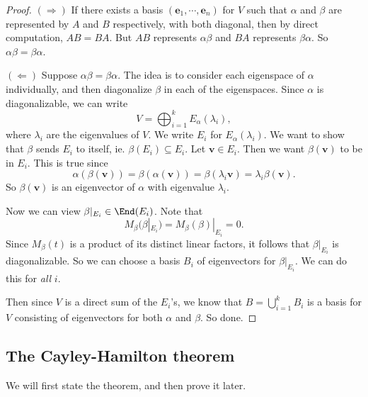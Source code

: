 \documentclass[a4paper]{article}
\begin{document}
\begin{proof}
  $(\Rightarrow)$ If there exists a basis $(\mathbf{e}_1, \cdots, \mathbf{e}_n)$ for $V$ such that $\alpha$ and $\beta$ are represented by $A$ and $B$ respectively, with both diagonal, then by direct computation, $AB = BA$. But $AB$ represents $\alpha\beta$ and $BA$ represents $\beta\alpha$. So $\alpha\beta = \beta\alpha$.

  $(\Leftarrow)$ Suppose $\alpha\beta = \beta\alpha$. The idea is to consider each eigenspace of $\alpha$ individually, and then diagonalize $\beta$ in each of the eigenspaces. Since $\alpha$ is diagonalizable, we can write
  \[
    V = \bigoplus_{i = 1}^k E_\alpha(\lambda_i),
  \]
  where $\lambda_i$ are the eigenvalues of $V$. We write $E_i$ for $E_\alpha (\lambda_i)$. We want to show that $\beta$ sends $E_i$ to itself, ie. $\beta(E_i) \subseteq E_i$. Let $\mathbf{v} \in E_i$. Then we want $\beta(\mathbf{v})$ to be in $E_i$. This is true since
  \[
    \alpha(\beta(\mathbf{v})) = \beta(\alpha(\mathbf{v})) = \beta(\lambda_i \mathbf{v}) = \lambda_i \beta(\mathbf{v}).
  \]
  So $\beta(\mathbf{v})$ is an eigenvector of $\alpha$ with eigenvalue $\lambda_i$.

  Now we can view $\beta|_{E_i} \in \End(E_i)$. Note that
  \[
    M_\beta(\beta|_{E_i}) = M_\beta(\beta)|_{E_i} = 0.
  \]
  Since $M_\beta(t)$ is a product of its distinct linear factors, it follows that $\beta|_{E_i}$ is diagonalizable. So we can choose a basis $B_i$ of eigenvectors for $\beta|_{E_i}$. We can do this for \emph{all} $i$.

  Then since $V$ is a direct sum of the $E_i$'s, we know that $B = \bigcup_{i = 1}^k B_i$ is a basis for $V$ consisting of eigenvectors for both $\alpha$ and $\beta$. So done.
\end{proof}

\subsection{The Cayley-Hamilton theorem}
We will first state the theorem, and then prove it later.
\end{document}
